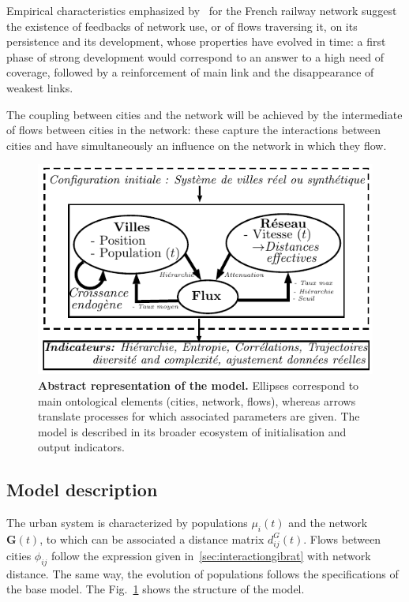 Empirical characteristics emphasized by~\cite{thevenin2013mapping} for the French railway network suggest the existence of feedbacks of network use, or of flows traversing it, on its persistence and its development, whose properties have evolved in time: a first phase of strong development would correspond to an answer to a high need of coverage, followed by a reinforcement of main link and the disappearance of weakest links.


The coupling between cities and the network will be achieved by the intermediate of flows between cities in the network: these capture the interactions between cities and have simultaneously an influence on the network in which they flow.


\begin{figure}
\includegraphics[width=\linewidth]{figures/model}
\caption[Schematic model representation]{\textbf{Abstract representation of the model.} Ellipses correspond to main ontological elements (cities, network, flows), whereas arrows translate processes for which associated parameters are given. The model is described in its broader ecosystem of initialisation and output indicators.\label{fig:macrocoevol:model}}
\end{figure}


\subsection{Model description}

The urban system is characterized by populations $\mu_i(t)$ and the network $\mathbf{G}(t)$, to which can be associated a distance matrix $d^G_{ij}(t)$. Flows between cities $\phi_{ij}$ follow the expression given in~\ref{sec:interactiongibrat} with network distance. The same way, the evolution of populations follows the specifications of the base model. The Fig.~\ref{fig:macrocoevol:model} shows the structure of the model.



